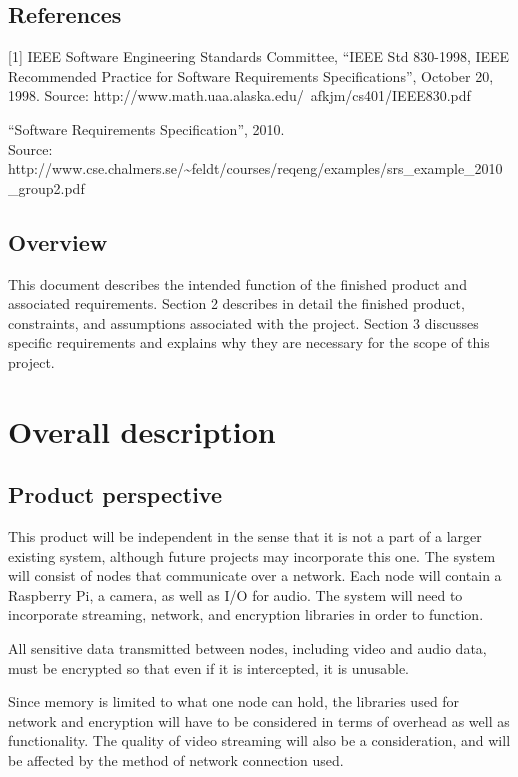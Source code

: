 \documentclass[onecolumn, draftclsnofoot,10pt, compsoc]{IEEEtran}
\begin{document}
\subsection{References}
[1] IEEE Software Engineering Standards Committee, “IEEE Std 830-1998, IEEE Recommended Practice for Software Requirements Specifications”, October 20, 1998. Source: http://www.math.uaa.alaska.edu/~afkjm/cs401/IEEE830.pdf

\noindent[2] “Software Requirements Specification”, 2010. \\
\noindent Source: http://www.cse.chalmers.se/\textasciitilde{}feldt/courses/reqeng/examples/srs\_example\_2010\_group2.pdf

\subsection{Overview}
This document describes the intended function of the finished product and associated requirements. Section 2 describes in detail the finished product, constraints, and assumptions associated with the project. Section 3 discusses specific requirements and explains why they are necessary for the scope of this project.

\section{Overall description}

\subsection{Product perspective}
This product will be independent in the sense that it is not a part of a larger existing system, although future projects may incorporate this one. The system will consist of nodes that communicate over a network. Each node will contain a Raspberry Pi, a camera, as well as I/O for audio. The system will need to incorporate streaming, network, and encryption libraries in order to function.

\noindent All sensitive data transmitted between nodes, including video and audio data, must be encrypted so that even if it is intercepted, it is unusable.  

\noindent Since memory is limited to what one node can hold, the libraries used for network and encryption will have to be considered in terms of overhead as well as functionality. The quality of video streaming will also be a consideration, and will be affected by the method of network connection used. 
\end{document}
